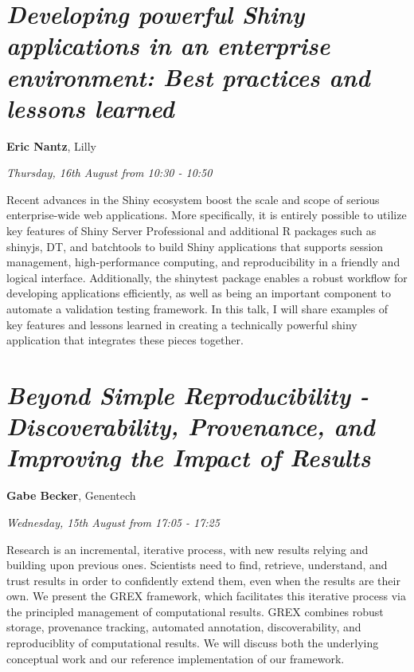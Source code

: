 \documentclass[]{book}
\theoremstyle{definition}
\theoremstyle{definition}
\theoremstyle{definition}
\theoremstyle{remark}
\begin{document}
\hypertarget{developing-powerful-shiny-applications-in-an-enterprise-environment-best-practices-and-lessons-learned}{%
\section{\texorpdfstring{\emph{Developing powerful Shiny applications in
an enterprise environment: Best practices and lessons
learned}}{Developing powerful Shiny applications in an enterprise environment: Best practices and lessons learned}}\label{developing-powerful-shiny-applications-in-an-enterprise-environment-best-practices-and-lessons-learned}}

\textbf{Eric Nantz}, Lilly

\emph{Thursday, 16th August from 10:30 - 10:50}

Recent advances in the Shiny ecosystem boost the scale and scope of
serious enterprise-wide web applications. More specifically, it is
entirely possible to utilize key features of Shiny Server Professional
and additional R packages such as shinyjs, DT, and batchtools to build
Shiny applications that supports session management, high-performance
computing, and reproducibility in a friendly and logical interface.
Additionally, the shinytest package enables a robust workflow for
developing applications efficiently, as well as being an important
component to automate a validation testing framework. In this talk, I
will share examples of key features and lessons learned in creating a
technically powerful shiny application that integrates these pieces
together.

\hypertarget{beyond-simple-reproducibility---discoverability-provenance-and-improving-the-impact-of-results}{%
\section{\texorpdfstring{\emph{Beyond Simple Reproducibility -
Discoverability, Provenance, and Improving the Impact of
Results}}{Beyond Simple Reproducibility - Discoverability, Provenance, and Improving the Impact of Results}}\label{beyond-simple-reproducibility---discoverability-provenance-and-improving-the-impact-of-results}}

\textbf{Gabe Becker}, Genentech

\emph{Wednesday, 15th August from 17:05 - 17:25}

Research is an incremental, iterative process, with new results relying
and building upon previous ones. Scientists need to find, retrieve,
understand, and trust results in order to confidently extend them, even
when the results are their own. We present the GREX framework, which
facilitates this iterative process via the principled management of
computational results. GREX combines robust storage, provenance
tracking, automated annotation, discoverability, and reproduciblity of
computational results. We will discuss both the underlying conceptual
work and our reference implementation of our framework.
\end{document}
